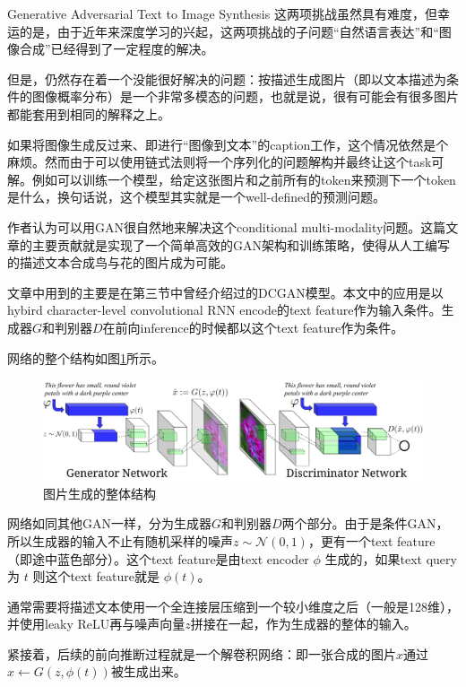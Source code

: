 \documentclass{ctexart}
\begin{document}
\begin{section}{Generative Adversarial Text to Image Synthesis}
		这两项挑战虽然具有难度，但幸运的是，由于近年来深度学习的兴起，这两项挑战的子问题“自然语言表达”和“图像合成”已经得到了一定程度的解决。
		
		但是，仍然存在着一个没能很好解决的问题：按描述生成图片（即以文本描述为条件的图像概率分布）是一个非常多模态的问题，也就是说，很有可能会有很多图片都能套用到相同的解释之上。
		
		如果将图像生成反过来、即进行“图像到文本”的caption工作，这个情况依然是个麻烦。然而由于可以使用链式法则将一个序列化的问题解构并最终让这个task可解。例如可以训练一个模型，给定这张图片和之前所有的token来预测下一个token是什么，换句话说，这个模型其实就是一个well-defined的预测问题。
		
		作者认为可以用GAN很自然地来解决这个conditional multi-modality问题。这篇文章的主要贡献就是实现了一个简单高效的GAN架构和训练策略，使得从人工编写的描述文本合成鸟与花的图片成为可能。
		
		文章中用到的主要是在第三节中曾经介绍过的DCGAN模型。本文中的应用是以hybird character-level convolutional RNN encode的text feature作为输入条件。生成器$G$和判别器$D$在前向inference的时候都以这个text feature作为条件。
		
		网络的整个结构如图\ref{fig:image-synthesis-struct}所示。
		
		\begin{figure}
			\centering
			\includegraphics[width=35em]{figures/image-synthesis-structure.png}
			\caption{图片生成的整体结构}
			\label{fig:image-synthesis-struct}
		\end{figure}
		
		网络如同其他GAN一样，分为生成器$G$和判别器$D$两个部分。由于是条件GAN，所以生成器的输入不止有随机采样的噪声$z\sim \mathcal{N}(0,1)$，更有一个text feature（即途中蓝色部分）。这个text feature是由text encoder $\phi$ 生成的，如果text query为 $t$ 则这个text feature就是 $\phi(t)$。
		
		通常需要将描述文本使用一个全连接层压缩到一个较小维度之后（一般是128维），并使用leaky ReLU再与噪声向量$z$拼接在一起，作为生成器的整体的输入。
		
		紧接着，后续的前向推断过程就是一个解卷积网络：即一张合成的图片$\hat{x}$通过$\hat{x}\leftarrow G(z,\phi(t))$被生成出来。
		

\end{section}
\end{document}
